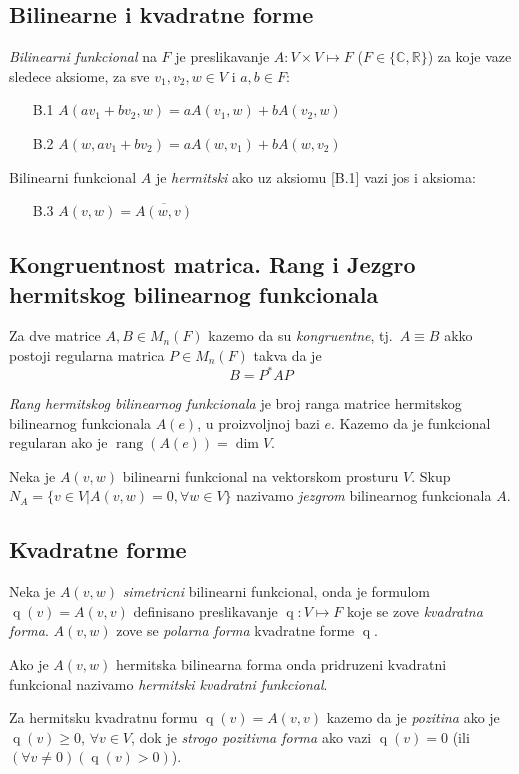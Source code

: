 \documentclass[12p,a4paper]{article}
\DeclareMathOperator{\rang}{rang}
\DeclareMathOperator{\q}{q}
\begin{document}
\begin{multicols}{2}
\section{Bilinearne i kvadratne forme}

    \textit{Bilinearni funkcional} na $F$ je preslikavanje 
    $A: V \times V \mapsto F$ ($F \in \{\mathbb{C}, \mathbb{R}\}$) za koje 
    vaze sledece aksiome, za sve $v_1, v_2, w \in V$ i $a, b \in F$:
    \begin{enumerate}
        \itemsep0em
        \item [B.1] $A (a v_1 + b v_2, w) = a A (v_1, w) + b A (v_2, w)$
        \item [B.2] $A (w, a v_1 + b v_2) = a A (w, v_1) + b A (w, v_2)$
    \end{enumerate}

    Bilinearni funkcional $A$ je \textit{hermitski} ako uz aksiomu [B.1] 
    vazi jos i aksioma:
    \begin{enumerate}
        \itemsep0em
        \item [B.3] $A (v, w) = \overline{A (w, v)}$
    \end{enumerate}

\subsection{Kongruentnost matrica. Rang i Jezgro hermitskog bilinearnog 
            funkcionala}

    Za dve matrice $A, B \in M_n(F)$ kazemo da su \textit{kongruentne}, tj.\ 
    $A \equiv B$ akko postoji regularna matrica $P \in M_n(F)$ takva da je
    \[B = P^{*} A P\]

    \textit{Rang hermitskog bilinearnog funkcionala} je broj ranga matrice 
    hermitskog bilinearnog funkcionala $A(e)$, u proizvoljnoj bazi $e$. Kazemo 
    da je funkcional regularan ako je $\rang (A(e)) = \dim V$.

    Neka je $A(v, w)$ bilinearni funkcional na vektorskom prosturu $V$. Skup 
    $N_A = \{v \in V | A(v, w) = 0, \forall w \in V\}$ nazivamo 
    \textit{jezgrom} bilinearnog funkcionala $A$.

\subsection{Kvadratne forme}

    Neka je $A(v, w)$ \textit{simetricni} bilinearni funkcional, onda je 
    formulom $\q (v) = A(v, v)$ definisano preslikavanje $\q : V \mapsto F$ 
    koje se zove \textit{kvadratna forma}. $A(v, w)$ zove se 
    \textit{polarna forma} kvadratne forme $\q$.

    Ako je $A(v, w)$ hermitska bilinearna forma onda pridruzeni kvadratni 
    funkcional nazivamo \textit{hermitski kvadratni funkcional}.

    Za hermitsku kvadratnu formu $\q (v) = A(v, v)$ kazemo da je 
    \textit{pozitina} ako je $\q (v) \geq 0$, $\forall v \in V$, dok je 
    \textit{strogo pozitivna forma} ako vazi $\q (v) = 0$ 
    (ili $(\forall v \neq 0)(\q (v) > 0)$).


\end{multicols}
\end{document}
